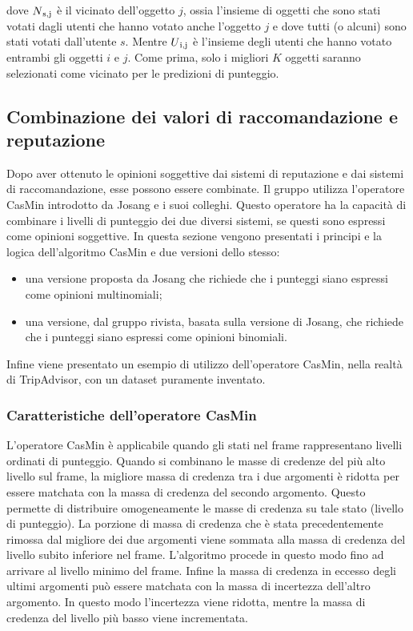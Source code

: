 \documentclass[letterpaper]{article} %
\begin{document}
dove $N\textsubscript{s,j}$ è il vicinato dell'oggetto $j$, ossia l'insieme di oggetti che
sono stati votati dagli utenti che hanno votato anche l'oggetto $j$ e dove
tutti (o alcuni) sono stati votati dall'utente $s$. Mentre $U\textsubscript{i,j}$ è
l'insieme degli utenti che hanno votato entrambi gli oggetti $i$ e $j$. Come
prima, solo i migliori $K$ oggetti saranno selezionati come vicinato per
le predizioni di punteggio.

\subsection{Combinazione dei valori di raccomandazione e reputazione}

Dopo aver ottenuto le opinioni soggettive dai sistemi di reputazione e
dai sistemi di raccomandazione, esse possono essere combinate. Il gruppo
utilizza l'operatore CasMin introdotto da Josang e i suoi colleghi.
Questo operatore ha la capacità di combinare i livelli di punteggio dei
due diversi sistemi, se questi sono espressi come opinioni soggettive.
In questa sezione vengono presentati i principi e la logica
dell'algoritmo CasMin e due versioni dello stesso:

\begin{itemize}
	\item
	una versione proposta da Josang che richiede che i punteggi siano
	espressi come opinioni multinomiali;
	\item
	una versione, dal gruppo rivista, basata sulla versione di Josang, che
	richiede che i punteggi siano espressi come opinioni binomiali.
\end{itemize}

Infine viene presentato un esempio di utilizzo dell'operatore CasMin,
nella realtà di TripAdvisor, con un dataset puramente inventato.

\subsubsection{Caratteristiche dell'operatore CasMin}

L'operatore CasMin è applicabile quando gli stati nel frame
rappresentano livelli ordinati di punteggio. Quando si combinano le
masse di credenze del più alto livello sul frame, la migliore massa di
credenza tra i due argomenti è ridotta per essere matchata con la massa
di credenza del secondo argomento. Questo permette di distribuire
omogeneamente le masse di credenza su tale stato (livello di punteggio). La porzione di massa
di credenza che è stata precedentemente rimossa dal migliore dei due
argomenti viene sommata alla massa di credenza del livello subito
inferiore nel frame. L'algoritmo procede in questo modo fino ad arrivare
al livello minimo del frame. Infine la massa di credenza in eccesso degli ultimi
argomenti può essere matchata con la massa di incertezza dell'altro
argomento. In questo modo l'incertezza viene ridotta, mentre la massa di
credenza del livello più basso viene incrementata.
\end{document}
